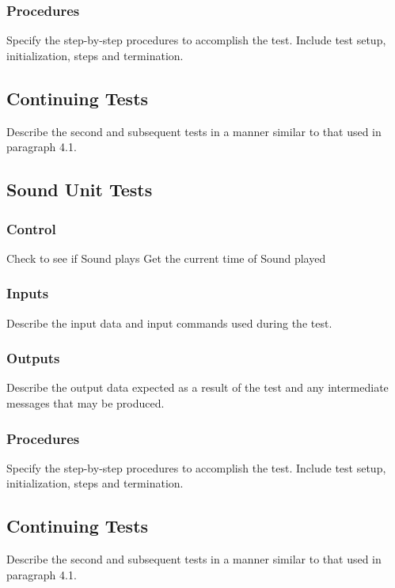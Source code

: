 \documentclass[11pt, oneside]{article}   	%
\begin{document}
\subsubsection{Procedures}
Specify the step-by-step procedures to accomplish the test. Include test setup, initialization, steps and termination.

\subsection{Continuing Tests}
Describe the second and subsequent tests in a manner similar to that used in paragraph 4.1.

\subsection{Sound Unit Tests}
\subsubsection{Control}
Check to see if Sound plays
Get the current time of Sound played

\subsubsection{Inputs}
Describe the input data and input commands used during the test.

\subsubsection{Outputs}
Describe the output data expected as a result of the test and any intermediate messages that may be produced.

\subsubsection{Procedures}
Specify the step-by-step procedures to accomplish the test. Include test setup, initialization, steps and termination.

\subsection{Continuing Tests}
Describe the second and subsequent tests in a manner similar to that used in paragraph 4.1.
\end{document}
